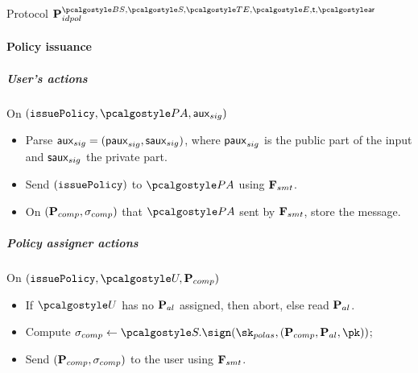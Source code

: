 \documentclass[runningheads,10pt]{llncs}
\numberwithin{equation}{section}
\begin{document}
\begin{protbox}{Protocol $\prot{idpol}^{\BSIG, \SIG, \TENC, \ENC, \thresholdar, \noofar}$}
\paragraph{Policy issuance}
\subparagraph{User's actions} On
$(\issuePolicy, \polas, \aux_{sig})$
\begin{itemize}
\item Parse $\mathsf{aux}_{sig} = (\mathsf{paux}_{sig}, \mathsf{saux}_{sig})$, where $\mathsf{paux}_{sig}$ is the public part of the input
  and $\mathsf{saux}_{sig}$ the private part.
\item Send $(\mathtt{issuePolicy})$ to $\polas$ using $\mathbf{F}_{{smt}}$.
\item On $(\mathbf{P}_{comp}, \sigma_{comp})$ that $\polas$ sent by $\mathbf{F}_{{smt}}$, store the
  message.
\end{itemize}

\subparagraph{Policy assigner actions} On $(\issuePolicy, \user, \comppolicy)$
\begin{itemize}
\item If $\user$ has no $\mathbf{P}_{al}$ assigned, then abort, else read $\mathbf{P}_{al}$.
\item Compute
  $\signature_{comp} \gets \SIG.\sign(\sk_{polas}, (\comppolicy, \alpolicy, \pk))$;
\item Send $(\mathbf{P}_{comp}, \sigma_{comp})$ to the user using $\mathbf{F}_{{smt}}$.
\end{itemize}
\end{protbox}
\end{document}
